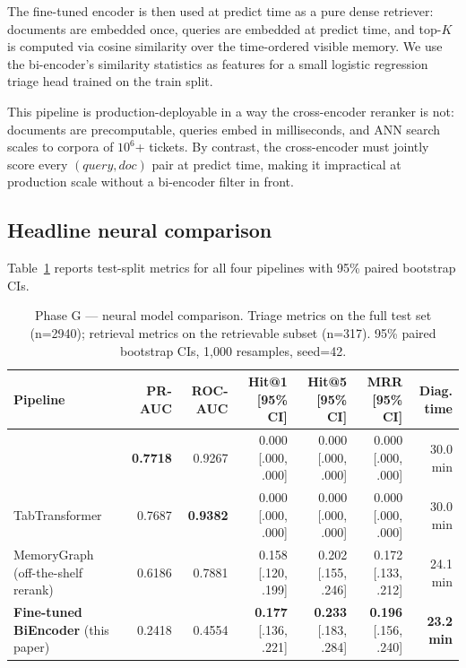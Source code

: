 The fine-tuned encoder is then used at predict time as a pure dense retriever: documents are embedded once, queries are embedded at predict time, and top-$K$ is computed via cosine similarity over the time-ordered visible memory. We use the bi-encoder's similarity statistics as features for a small logistic regression triage head trained on the train split.

This pipeline is production-deployable in a way the cross-encoder reranker is not: documents are precomputable, queries embed in milliseconds, and ANN search scales to corpora of $10^6$+ tickets. By contrast, the cross-encoder must jointly score every $(\textit{query}, \textit{doc})$ pair at predict time, making it impractical at production scale without a bi-encoder filter in front.

\subsection{Headline neural comparison}

Table~\ref{tab:neural-headline} reports test-split metrics for all four pipelines with 95\% paired bootstrap CIs.

\begin{table}[t]
\centering
\small
\caption{Phase G — neural model comparison. Triage metrics on the full test set (n=2940); retrieval metrics on the retrievable subset (n=317). 95\% paired bootstrap CIs, 1{,}000 resamples, seed=42.}
\label{tab:neural-headline}
\begin{tabular}{lrrrrrr}
\toprule
Pipeline                                    & PR-AUC      & ROC-AUC & Hit@1 [95\% CI]      & Hit@5 [95\% CI]      & MRR [95\% CI]         & Diag. time \\
\midrule
\hgb{}                                      & \textbf{0.7718} & 0.9267  & 0.000 [.000, .000] & 0.000 [.000, .000]   & 0.000 [.000, .000]    & 30.0 min   \\
TabTransformer                              & 0.7687      & \textbf{0.9382} & 0.000 [.000, .000] & 0.000 [.000, .000]   & 0.000 [.000, .000]    & 30.0 min   \\
MemoryGraph \sota{} (off-the-shelf rerank)  & 0.6186      & 0.7881  & 0.158 [.120, .199] & 0.202 [.155, .246]   & 0.172 [.133, .212]    & 24.1 min   \\
\textbf{Fine-tuned BiEncoder} (this paper)  & 0.2418      & 0.4554  & \textbf{0.177} [.136, .221] & \textbf{0.233} [.183, .284] & \textbf{0.196} [.156, .240] & \textbf{23.2 min} \\
\bottomrule
\end{tabular}
\end{table}

